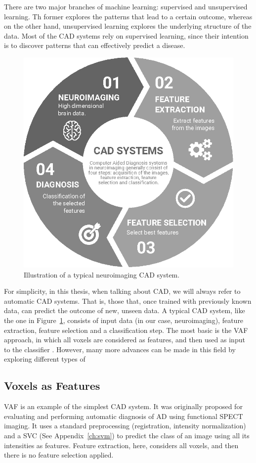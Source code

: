 There are two major branches of machine learning: supervised and unsupervised learning. Th former explores the patterns that lead to a certain outcome, whereas on the other hand, unsupervised learning explores the underlying structure of the data. Most of the \ac{CAD} systems rely on supervised learning, since their intention is to discover patterns that can effectively predict a disease. 

\begin{figure}[htp]
	\centering
	\includegraphics[width=0.5\linewidth]{Graphics/ch2/NI-CAD}
	\caption[Illustration of a typical neuroimaging \acs{CAD} system.]{Illustration of a typical neuroimaging \ac{CAD} system.}
	\label{fig:ni-cad}
\end{figure}

For simplicity, in this thesis, when talking about \ac{CAD}, we will always refer to automatic \ac{CAD} systems. That is, those that, once trained with previously known data, can predict the outcome of new, unseen data. A typical \ac{CAD} system, like the one in Figure~\ref{fig:ni-cad}, consists of input data (in our case, neuroimaging), feature extraction, feature selection and a classification step. The most basic is the \acf{VAF} approach, in which all voxels are considered as features, and then used as input to the classifier \cite{Stoeckel04}. However, many more advances can be made in this field by exploring different types of 

\subsection{Voxels as Features}
\acf{VAF} \cite{Stoeckel04} is an example of the simplest \ac{CAD} system. It was originally proposed for evaluating and performing automatic diagnosis of \ac{AD} using functional \ac{SPECT} imaging. It uses a standard preprocessing (registration, intensity normalization) and a \ac{SVC} (See Appendix~\ref{ch:svm}) to predict the class of an image using all its intensities as features. Feature extraction, here, considers all voxels, and then there is no feature selection applied. 

